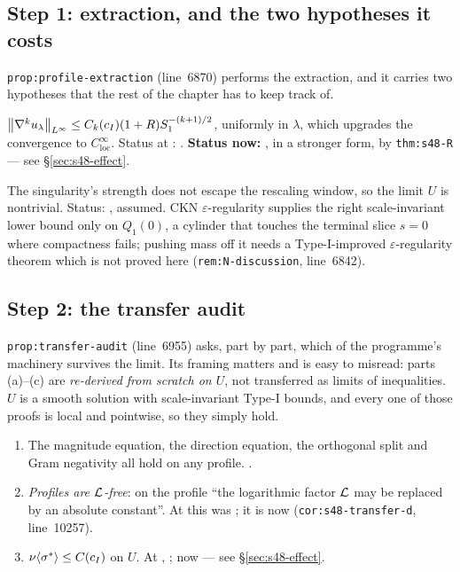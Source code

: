 \subsection{Step 1: extraction, and the two hypotheses it costs}

\texttt{prop:profile-extraction} (line~6870) performs the extraction, and it
carries two hypotheses that the rest of the chapter has to keep track of.

\begin{statement}
\label{st:R}
\(\left\|\nabla^k u_\lambda\right\|_{L^\infty}\le C_k(c_I)(1+R)S_1^{-(k+1)/2}\),
uniformly in \(\lambda\), which upgrades the convergence to
\(C^\infty_{\mathrm{loc}}\).
Status at : . \textbf{Status now:} \PROVED{},
in a stronger form, by \texttt{thm:s48-R} --- see \S\ref{sec:s48-effect}.
\end{statement}

\begin{statement}
\label{st:N}
The singularity's strength does not escape the rescaling window, so the limit
\(U\) is nontrivial. Status: \OPEN{}, assumed. CKN
\(\varepsilon\)-regularity supplies the right scale-invariant lower bound only
on \(Q_1(0)\), a cylinder that touches the terminal slice \(s=0\) where
compactness fails; pushing mass off it needs a Type-I-improved
\(\varepsilon\)-regularity theorem which is not proved here
(\texttt{rem:N-discussion}, line~6842).
\end{statement}

\subsection{Step 2: the transfer audit}

\texttt{prop:transfer-audit} (line~6955) asks, part by part, which of the
programme's machinery survives the limit. Its framing matters and is easy to
misread: parts (a)--(c) are \emph{re-derived from scratch on \(U\)}, not
transferred as limits of inequalities. \(U\) is a smooth solution with
scale-invariant Type-I bounds, and every one of those proofs is local and
pointwise, so they simply hold.

\begin{enumerate}[label=(\alph*),leftmargin=2.2em]
\item[(a)--(c)] The magnitude equation, the direction equation, the orthogonal
  split and Gram negativity all hold on any profile. \PROVED{}.
\item[(d)] \emph{Profiles are \(\mathcal{L}\)-free}: on the profile ``the
  logarithmic factor \(\mathcal{L}\) may be replaced by an absolute constant''. At
   this was ; it is now \PROVED{}
  (\texttt{cor:s48-transfer-d}, line~10257).
\item[(e)] \(\nu\langle\sigma^{*}\rangle\le C(c_I)\) on \(U\). At ,
  ; now  --- see
  \S\ref{sec:s48-effect}.
\end{enumerate}

